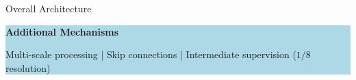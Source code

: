 ﻿\documentclass[
    11pt,%
    aspectratio=169,%
]{beamer}
\begin{document}
\begin{frame}{Overall Architecture}
\begin{beamercolorbox}[
    rounded=true,
    sep=0.07cm,
    wd=\textwidth
]{}

\colorbox{LightBlue}{
    \parbox{\dimexpr\textwidth-2\fboxsep\relax}{
        {\color{Navy}\bfseries
        Additional Mechanisms}

        \vspace{0.03cm}

        \fontsize{8.5}{10}\selectfont

        Multi-scale processing
        \quad | \quad
        Skip connections
        \quad | \quad
        Intermediate supervision ($1/8$ resolution)
    }
}

\end{beamercolorbox}
\end{frame}
\end{document}
